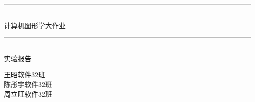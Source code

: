 \newcommand{\HRule}{\rule{\linewidth}{0.5mm}}
\begin{titlepage}
\begin{center}

\HRule \\[0.7cm]
{\huge 计算机图形学大作业} \\[0.2cm]
\HRule \\[1.2cm]

\textsc{\LARGE 实验报告} \\[6cm]

\begin{flushright}
\large 王\quad 昭\quad 软件32班\\
\large 陈彤宇\quad 软件32班\\
\large 周立旺\quad 软件32班
\end{flushright}

\end{center}
\end{titlepage}
